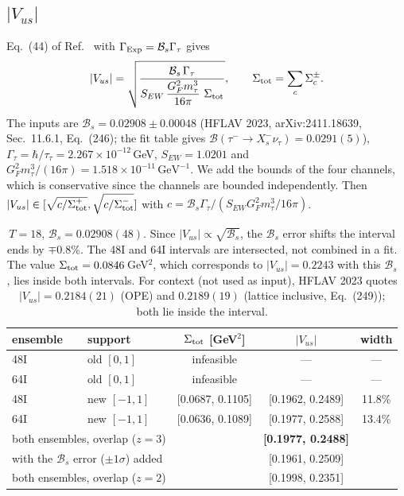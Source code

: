 \documentclass[11pt]{article}
\newcommand{\Vus}{|V_{us}|}
\newcommand{\BR}{\mathcal{B}}
\theoremstyle{remark}
\begin{document}
\subsection{$\Vus$}\label{sec:vus}
Eq.~(44) of Ref.~\cite{Chen:TauNote} with $\Gamma_{\rm Exp}=\BR_s\Gamma_\tau$ gives
\begin{equation}
 \Vus=\sqrt{\frac{\BR_s\,\Gamma_\tau}{S_{EW}\,\dfrac{G_F^2m_\tau^3}{16\pi}\ \Sigma_{\rm tot}}},\qquad
 \Sigma_{\rm tot}=\sum_{c}\Sigma_c^{\pm}.
\end{equation}
The inputs are $\BR_s=0.02908\pm0.00048$ (HFLAV 2023, arXiv:2411.18639, Sec.~11.6.1, Eq.~(246); the fit table gives $\BR(\tau^-\to X_s^-\nu_\tau)=0.0291(5)$),
$\Gamma_\tau=\hbar/\tau_\tau=2.267\times10^{-12}$\,GeV, $S_{EW}=1.0201$ and $G_F^2m_\tau^3/(16\pi)=1.518\times10^{-11}\,\mathrm{GeV}^{-1}$. We add the bounds of the four channels,
which is conservative since the channels are bounded independently. Then $\Vus\in[\sqrt{c/\Sigma^+_{\rm tot}},\sqrt{c/\Sigma^-_{\rm tot}}]$ with $c=\BR_s\Gamma_\tau/(S_{EW}G_F^2m_\tau^3/16\pi)$.
\begin{table}[h]
\centering\small
\begin{tabular}{llccc}
\toprule
ensemble & support & $\Sigma_{\rm tot}$ [GeV$^2$] & $\Vus$ & width\\
\midrule
48I & old $[0,1]$ & infeasible & --- & ---\\
64I & old $[0,1]$ & infeasible & --- & ---\\
48I & new $[-1,1]$ & [0.0687, 0.1105] & [0.1962, 0.2489] & 11.8\%\\
64I & new $[-1,1]$ & [0.0636, 0.1089] & [0.1977, 0.2588] & 13.4\%\\
\multicolumn{2}{l}{both ensembles, overlap ($z=3$)} & & \textbf{[0.1977, 0.2488]} & \\
\multicolumn{2}{l}{\quad with the $\BR_s$ error ($\pm1\sigma$) added} & & [0.1961, 0.2509] & \\
\multicolumn{2}{l}{both ensembles, overlap ($z=2$)} & & [0.1998, 0.2351] & \\
\bottomrule
\end{tabular}
\caption{$T=18$, $\BR_s=0.02908(48)$. Since $\Vus\propto\sqrt{\BR_s}$, the $\BR_s$ error shifts the interval ends by $\mp0.8\%$. The 48I and 64I intervals are intersected, not combined in a fit.
The value $\Sigma_{\rm tot}=0.0846$\,GeV$^2$, which corresponds to $\Vus=0.2243$ with this $\BR_s$, lies inside both intervals.
For context (not used as input), HFLAV 2023 quotes $\Vus=0.2184(21)$ (OPE) and $0.2189(19)$ (lattice inclusive, Eq.~(249)); both lie inside the interval.}
\end{table}
\end{document}
